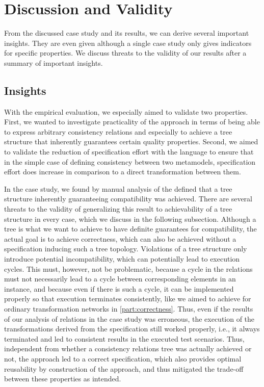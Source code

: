 \section{Discussion and Validity}

From the discussed case study and its results, we can derive several important insights.
They are even given although a single case study only gives indicators for specific properties. %
We discuss threats to the validity of our results after a summary of important insights.

\subsection*{Insights}

With the empirical evaluation, we especially aimed to validate two properties.
First, we wanted to investigate practicality of the \commonalities approach in terms of being able to express arbitrary consistency relations and especially to achieve a tree structure that inherently guarantees certain quality properties.
Second, we aimed to validate the reduction of specification effort with the \commonalities language to ensure that in the simple case of defining consistency between two metamodels, specification effort does increase in comparison to a direct transformation between them.

In the case study, we found by manual analysis of the defined \commonalities that a tree structure inherently guaranteeing compatibility was achieved.
There are several threats to the validity of generalizing this result to achievability of a tree structure in every case, which we discuss in the following subsection.
Although a tree is what we want to achieve to have definite guarantees for compatibility, the actual goal is to achieve correctness, which can also be achieved without a specification inducing such a tree topology.
Violations of a tree structure only introduce potential incompatibility, which can potentially lead to execution cycles.
This must, however, not be problematic, because a cycle in the relations must not necessarily lead to a cycle between corresponding elements in an instance, and because even if there is such a cycle, it can be implemented properly so that execution terminates consistently, like we aimed to achieve for ordinary transformation networks in \autoref{part:correctness}.
Thus, even if the results of our analysis of relations in the case study was erroneous, the execution of the transformations derived from the \commonalities specification still worked properly, i.e., it always terminated and led to consistent results in the executed test scenarios.
Thus, independent from whether a consistency relations tree was actually achieved or not, the approach led to a correct specification, which also provides optimal reusability by construction of the \commonalities approach, and thus mitigated the trade-off between these properties as intended.

